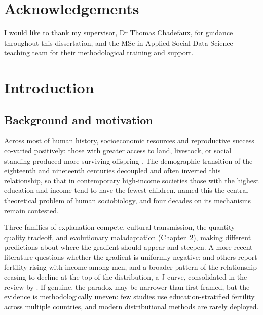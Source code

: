 \documentclass[12pt,a4paper]{report}
\begin{document}
\chapter*{Acknowledgements}
I would like to thank my supervisor, Dr Thomas Chadefaux, for guidance throughout this
dissertation, and the MSc in Applied Social Data Science teaching team for their
methodological training and support.

\tableofcontents
\listoffigures
\listoftables

\clearpage
{}

\chapter{Introduction}

\section{Background and motivation}
Across most of human history, socioeconomic resources and reproductive success co-varied
positively: those with greater access to land, livestock, or social standing produced more
surviving offspring \citep{boone1986,voland1990,hopcroft2006,nettlepollet2008}. The demographic
transition of the eighteenth and nineteenth centuries decoupled and often inverted this
relationship, so that in contemporary high-income societies those with the highest education
and income tend to have the fewest children. \citet{vining1986} named this the central
theoretical problem of human sociobiology, and four decades on its mechanisms remain
contested.

Three families of explanation compete, cultural transmission, the quantity--quality tradeoff, and
evolutionary maladaptation (Chapter~2), making different predictions about where the gradient should
appear and steepen. A
more recent literature questions whether the gradient is uniformly negative: \citet{hopcroft2006}
and others report fertility rising with income among men, and a broader pattern of the relationship
ceasing to decline at the top of the distribution, a J-curve, consolidated in the review by
\citet{stulpbarrett2016}. If genuine, the paradox may be narrower than first framed, but the evidence
is methodologically uneven: few studies
use education-stratified fertility across multiple countries, and modern distributional methods
are rarely deployed.
\end{document}
